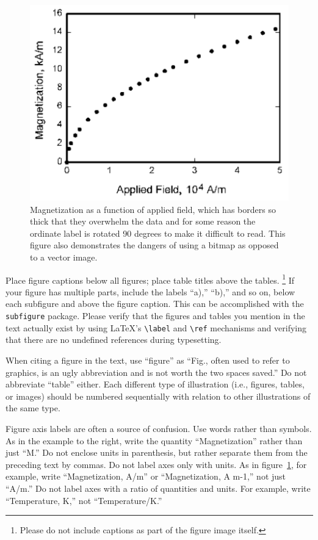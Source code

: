 \documentclass{aiaa-tc}%
\newcommand{\pkg}[1]{\texttt{#1}}
\begin{document}
\begin{figure}
 \includegraphics{figure_magnet}
 \caption{Magnetization as a function of applied field, which has
   borders so thick that they overwhelm the data and for some reason the
   ordinate label is rotated 90 degrees to make it difficult to
   read. This figure also demonstrates the dangers of using a bitmap
   as opposed to a vector image.}
 \label{f:magnetic_field}
\end{figure}

Place figure captions below all figures; place table titles above the
tables.%
\footnote{Please do not include captions as part of the figure image
itself.}
If your figure has multiple parts, include the labels ``a),'' ``b),''
and so on, below each subfigure and above the figure caption.
This can be accomplished with the \pkg{subfigure} package.
Please verify that the figures and tables you mention in the text
actually exist by using \LaTeX's \verb|\label| and \verb|\ref| mechanisms
and verifying that there are no undefined references during typesetting.

When citing a figure in the text, use ``figure'' as ``Fig., often used
to refer to graphics, is an ugly abbreviation and is not worth the two
spaces saved.''\cite{tufte:83bk}
Do not abbreviate ``table'' either.
Each different type of illustration (i.e., figures, tables, or
images) should be numbered sequentially with relation to other
illustrations of the same type.

Figure axis labels are often a source of confusion.
Use words rather than symbols.
As in the example to the right, write the quantity ``Magnetization''
rather than just ``M.''
Do not enclose units in parenthesis, but rather separate them from the
preceding text by commas.
Do not label axes only with units.
As in figure~\ref{f:magnetic_field}, for example, write ``Magnetization,
A/m'' or ``Magnetization, A m-1,'' not just ``A/m.''
Do not label axes with a ratio of quantities and units.
For example, write ``Temperature, K,'' not ``Temperature/K.''
\end{document}
